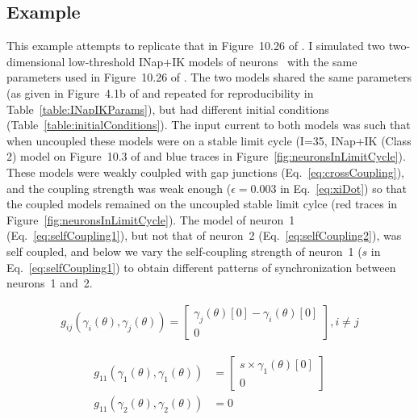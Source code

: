 \documentclass{article}
\begin{document}
\subsection*{Example}

This example attempts to replicate that in Figure~10.26 of
\citet{izhikevich07}. 
I simulated two two-dimensional low-threshold INap+IK models of
neurons~\citep{izhikevich07} with the same parameters used in
Figure~10.26 of \citet{izhikevich07}. The two models shared the same
parameters (as given in Figure~4.1b of \citet{izhikevich07} and repeated for
reproducibility in Table~\ref{table:INapIKParams}), but had different initial
conditions (Table~\ref{table:initialConditions}). The input current to both
models was such that when uncoupled these models were on a stable limit cycle
(I=35, INap+IK (Class 2) model on Figure~10.3 of \citet{izhikevich07} and blue
traces in Figure~\ref{fig:neuronsInLimitCycle}). These models were weakly
coulpled with gap junctions (Eq.~\ref{eq:crossCoupling}), and the coupling strength was weak enough
($\epsilon=0.003$ in Eq.~\ref{eq:xiDot}) so that
the coupled models
remained on the uncoupled stable limit cylce (red traces in
Figure~\ref{fig:neuronsInLimitCycle}). The model of neuron~1
(Eq.~\ref{eq:selfCoupling1}), but not that of
neuron~2 (Eq.~\ref{eq:selfCoupling2}), was self coupled, and below we vary the
self-coupling strength of neuron~1 ($s$ in Eq.~\ref{eq:selfCoupling1}) to
obtain different patterns of synchronization between neurons~1 and~2.

\begin{align}
g_{ij}(\gamma_i(\theta),\gamma_j(\theta))=\left[\begin{array}{c}
                                                  \gamma_j(\theta)[0]-\gamma_i(\theta)[0]\\
                                                  0
                                                \end{array}\right], i\ne j
\label{eq:crossCoupling}
\end{align}

\begin{align}
g_{11}(\gamma_1(\theta),\gamma_1(\theta))&=\left[\begin{array}{c}
                                                   s\times \gamma_1(\theta)[0]\\
                                                   0
                                                 \end{array}\right]\label{eq:selfCoupling1}\\
g_{11}(\gamma_2(\theta),\gamma_2(\theta))&=0\label{eq:selfCoupling2}
\end{align}
\end{document}
